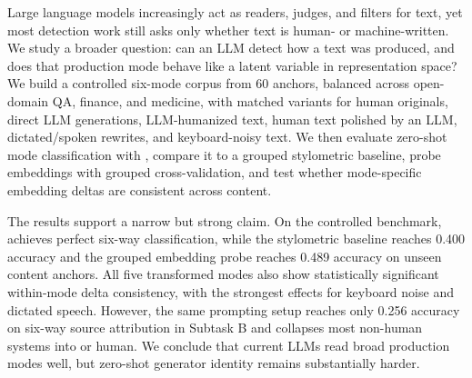 Large language models increasingly act as readers, judges, and filters for text, yet most detection work still asks only whether text is human- or machine-written. We study a broader question: can an LLM detect how a text was produced, and does that production mode behave like a latent variable in representation space? We build a controlled six-mode corpus from 60 \hcthree anchors, balanced across open-domain QA, finance, and medicine, with matched variants for human originals, direct LLM generations, LLM-humanized text, human text polished by an LLM, dictated/spoken rewrites, and keyboard-noisy text. We then evaluate zero-shot mode classification with \gptfourone, compare it to a grouped stylometric baseline, probe \embeddingmodel embeddings with grouped cross-validation, and test whether mode-specific embedding deltas are consistent across content.

The results support a narrow but strong claim. On the controlled benchmark, \gptfourone achieves perfect six-way classification, while the stylometric baseline reaches 0.400 accuracy and the grouped embedding probe reaches 0.489 accuracy on unseen content anchors. All five transformed modes also show statistically significant within-mode delta consistency, with the strongest effects for keyboard noise and dictated speech. However, the same prompting setup reaches only 0.256 accuracy on six-way source attribution in \semeval Subtask B and collapses most non-human systems into \chatgptlabel or human. We conclude that current LLMs read broad production modes well, but zero-shot generator identity remains substantially harder.
